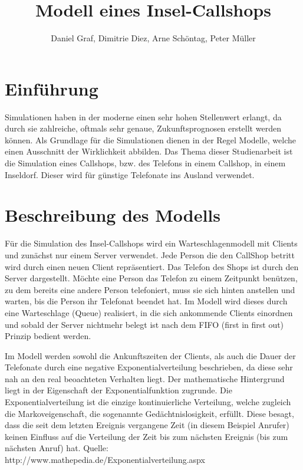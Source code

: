 

\title{Modell eines Insel-Callshops}
\providecommand{\subtitle}[1]{}
\subtitle{2. Projekt zu Modellierung und Simulation}
\author{Daniel Graf, Dimitrie Diez, Arne Schöntag, Peter Müller}
\date{}



\maketitle

\tableofcontents
\section{Einführung}
Simulationen haben in der moderne einen sehr hohen Stellenwert erlangt, da durch sie zahlreiche, oftmals sehr genaue, Zukunftsprognosen erstellt werden können. Als Grundlage für die Simulationen dienen in der Regel Modelle, welche einen Ausschnitt der Wirklichkeit abbilden. Das Thema dieser Studienarbeit ist die Simulation eines Callshops, bzw. des Telefons in einem Callshop, in einem Inseldorf. Dieser wird für günstige Telefonate ins Ausland verwendet. 

\section{Beschreibung des Modells}
Für die Simulation des Insel-Callshops wird ein Warteschlagenmodell mit Clients und zunächst nur einem Server verwendet. Jede Person die den CallShop betritt wird durch einen neuen Client repräsentiert. Das Telefon des Shops ist durch den Server dargestellt. Möchte eine Person das Telefon zu einem Zeitpunkt benützen, zu dem bereits eine andere Person telefoniert, muss sie sich hinten anstellen und warten, bis die Person ihr Telefonat beendet hat. Im Modell wird dieses durch eine Warteschlage (Queue) realisiert, in die sich ankommende Clients einordnen und sobald der Server nichtmehr belegt ist nach dem FIFO (first in first out) Prinzip bedient werden. 

Im Modell werden sowohl die Ankunftszeiten der Clients, als auch die Dauer der Telefonate durch eine negative Exponentialverteilung beschrieben, da diese sehr nah an den real beoachteten Verhalten liegt. Der mathematische Hintergrund liegt in der Eigenschaft der Exponentialfunktion zugrunde. Die Exponentialverteilung ist die einzige kontinuierliche Verteilung, welche zugleich die Markoveigenschaft, die sogenannte Gedächtnislosigkeit, erfüllt. Diese besagt, dass die seit dem letzten Ereignis vergangene Zeit (in diesem Beispiel Anrufer) keinen Einfluss auf die Verteilung der Zeit bis zum nächsten Ereignis (bis zum nächsten Anruf) hat. 
Quelle: http://www.mathepedia.de/Exponentialverteilung.aspx

